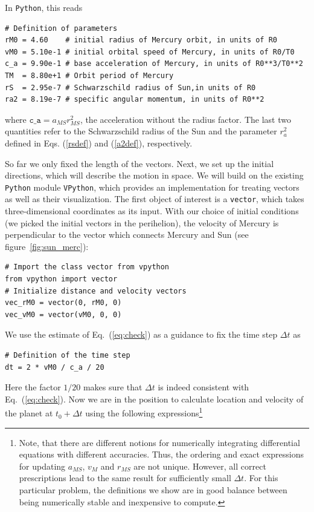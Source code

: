 \documentclass[12pt,ngerman,american]{iopart}
\newcommand{\python}[0]{\texttt{Python}}
\newcommand{\vpython}[0]{\texttt{VPython}}
\begin{document}
In \python{}, this reads
\begin{lstlisting}
# Definition of parameters
rM0 = 4.60    # initial radius of Mercury orbit, in units of R0
vM0 = 5.10e-1 # initial orbital speed of Mercury, in units of R0/T0
c_a = 9.90e-1 # base acceleration of Mercury, in units of R0**3/T0**2
TM  = 8.80e+1 # Orbit period of Mercury
rS  = 2.95e-7 # Schwarzschild radius of Sun,in units of R0
ra2 = 8.19e-7 # specific angular momentum, in units of R0**2
\end{lstlisting}
where $\texttt{c\_a} =a_{MS} r_{MS}^2$, the acceleration without the radius factor.
The last two quantities refer to the Schwarzschild radius of the Sun and the parameter $r_a^2$ defined in Eqs. (\ref{rsdef}) and (\ref{a2def}), respectively.

So far we only fixed the length of the vectors. Next, we set up the initial directions, which will describe the motion in space.
We will build on the existing \python{} module \vpython{}, which provides an implementation for treating vectors as well as their visualization.
The first object of interest is a \texttt{vector}, which takes three-dimensional coordinates as its input.
With our choice of initial conditions (we picked the initial vectors in the perihelion), the velocity of Mercury is perpendicular to the vector which connects Mercury and Sun (see figure~\ref{fig:sun_merc}):
\begin{lstlisting}
# Import the class vector from vpython
from vpython import vector
# Initialize distance and velocity vectors
vec_rM0 = vector(0, rM0, 0)
vec_vM0 = vector(vM0, 0, 0)
\end{lstlisting}
We use the estimate of Eq.~(\ref{eq:check}) as a guidance to fix the time step $\Delta t$ as
\begin{lstlisting}
# Definition of the time step
dt = 2 * vM0 / c_a / 20
\end{lstlisting}
Here the factor $1/20$ makes sure that $\Delta t$ is indeed consistent with Eq.~(\ref{eq:check}).
Now we are in the position to calculate location and velocity of the planet at $t_0+\Delta t$ using the following expressions\footnote{%
	Note, that there are different notions for numerically integrating differential equations with different accuracies.
	Thus, the ordering and exact expressions for updating $a_{MS}$, $v_M$ and $r_{MS}$ are not unique. However, all correct prescriptions lead to the same result for sufficiently small $\Delta t$.
	For this particular problem, the definitions we show are in good balance between being numerically stable and inexpensive to compute.
}%
\end{document}
